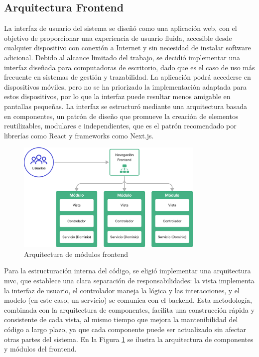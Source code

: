 \subsection{Arquitectura Frontend}

La interfaz de usuario del sistema se diseñó como una aplicación web, con el objetivo de proporcionar una experiencia de usuario fluida, accesible desde cualquier dispositivo con conexión a Internet y sin necesidad de instalar software adicional. Debido al alcance limitado del trabajo, se decidió implementar una interfaz diseñada para computadoras de escritorio, dado que es el caso de uso más frecuente en sistemas de gestión y trazabilidad. La aplicación podrá accederse en dispositivos móviles, pero no se ha priorizado la implementación adaptada para estos dispositivos, por lo que la interfaz puede resultar menos amigable en pantallas pequeñas. La interfaz se estructuró mediante una arquitectura basada en componentes, un patrón de diseño que promueve la creación de elementos reutilizables, modulares e independientes, que es el patrón recomendado por librerías como React y frameworks como Next.js.

\begin{figure}[!b]
\centering
\includegraphics[width=0.8\textwidth]{Figures/frontend-architecture.png}
\caption{Arquitectura de módulos frontend}
\label{fig:frontend-architecture}
\end{figure}

Para la estructuración interna del código, se eligió implementar una arquitectura \acrfull{mvc}, que establece una clara separación de responsabilidades: la vista implementa la interfaz de usuario, el controlador maneja la lógica y las interacciones, y el modelo (en este caso, un servicio) se comunica con el backend. Esta metodología, combinada con la arquitectura de componentes, facilita una construcción rápida y consistente de cada vista, al mismo tiempo que mejora la mantenibilidad del código a largo plazo, ya que cada componente puede ser actualizado sin afectar otras partes del sistema. En la Figura \ref{fig:frontend-architecture} se ilustra la arquitectura de componentes y módulos del frontend.

